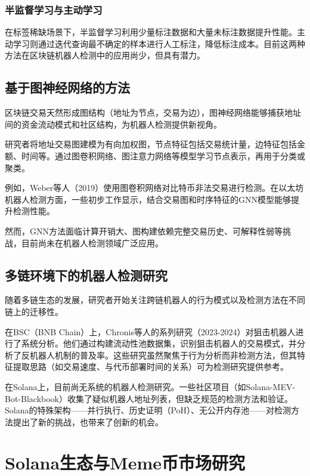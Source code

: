 \subsubsection {半监督学习与主动学习}
\par 在标签稀缺场景下，半监督学习利用少量标注数据和大量未标注数据提升性能。主动学习则通过迭代查询最不确定的样本进行人工标注，降低标注成本。目前这两种方法在区块链机器人检测中的应用尚少，但具有潜力。

\subsection{基于图神经网络的方法}

\par 区块链交易天然形成图结构（地址为节点，交易为边），图神经网络能够捕获地址间的资金流动模式和社区结构，为机器人检测提供新视角。
\par 研究者将地址交易图建模为有向加权图，节点特征包括交易统计量，边特征包括金额、时间等。通过图卷积网络、图注意力网络等模型学习节点表示，再用于分类或聚类。
\par 例如，Weber等人（2019）使用图卷积网络对比特币非法交易进行检测。在以太坊机器人检测方面，一些初步工作显示，结合交易图和时序特征的GNN模型能够提升检测性能。
\par 然而，GNN方法面临计算开销大、图构建依赖完整交易历史、可解释性弱等挑战，目前尚未在机器人检测领域广泛应用。

\subsection{多链环境下的机器人检测研究}

\par 随着多链生态的发展，研究者开始关注跨链机器人的行为模式以及检测方法在不同链上的迁移性。
\par 在BSC（BNB Chain）上，Chronis等人的系列研究（2023-2024）对狙击机器人进行了系统分析。他们通过构建流动性池数据集，识别狙击机器人的交易模式，并分析了反机器人机制的普及率。这些研究虽然聚焦于行为分析而非检测方法，但其特征提取思路（如交易速度、与代币部署时间的关系）可为检测研究提供参考。
\par 在Solana上，目前尚无系统的机器人检测研究。一些社区项目（如Solana-MEV-Bot-Blackbook）收集了疑似机器人地址列表，但缺乏规范的检测方法和验证。Solana的特殊架构——并行执行、历史证明（PoH）、无公开内存池——对检测方法提出了新的挑战，也带来了创新的机会。



\section{Solana生态与Meme币市场研究}

